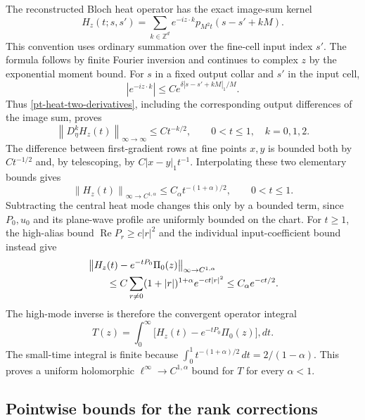 \documentclass[11pt]{article}
\theoremstyle{remark}
\newcommand{\norm}[1]{\left\|#1\right\|}
\begin{document}
The reconstructed Bloch heat operator has the exact image-sum kernel
\begin{equation}\label{pt-twisted-heat}
 H_z(t;s,s')=\sum_{k\in\mathbb Z^d}
             e^{-iz\cdot k}p_{M^2t}(s-s'+kM).
\end{equation}
This convention uses ordinary summation over the fine-cell input
index $s'$. The formula follows by finite Fourier inversion and
continues to complex $z$ by the exponential moment bound.
For $s$ in a fixed output collar and $s'$ in the input cell,
\[
 |e^{-iz\cdot k}|
       \le C e^{\delta|s-s'+kM|_1/M}.
\]
Thus \eqref{pt-heat-two-derivatives}, including the corresponding
output differences of the image sum, proves
\begin{equation}\label{pt-twisted-derivatives}
 \norm{D_\eta^kH_z(t)}_{\infty\to\infty}
       \le Ct^{-k/2},\qquad 0<t\le1,\quad k=0,1,2.
\end{equation}
The difference between first-gradient rows at fine points $x,y$ is
bounded both by $Ct^{-1/2}$ and, by telescoping, by
$C|x-y|_1t^{-1}$. Interpolating these two elementary bounds gives
\begin{equation}\label{pt-heat-holder}
 \norm{H_z(t)}_{\infty\to C^{1,\alpha}}
       \le C_\alpha t^{-(1+\alpha)/2},\qquad 0<t\le1.
\end{equation}
Subtracting the central heat mode changes this only by a bounded
term, since $P_0,u_0$ and its plane-wave profile are uniformly bounded
on the chart. For $t\ge1$, the high-alias bound
$\operatorname{Re}P_r\ge c|r|^2$ and the individual input-coefficient
bound instead give
\begin{align}
 &\norm{H_z(t)-e^{-tP_0}\Pi_0(z)}_{\infty\to C^{1,\alpha}}
       \notag\\
 &\qquad\le C\sum_{r\ne0}(1+|r|)^{1+\alpha}e^{-ct|r|^2}
       \le C_\alpha e^{-ct/2}.
       \label{pt-heat-large-time}
\end{align}
The high-mode inverse is therefore the convergent operator integral
\begin{equation}\label{pt-scalar-integral}
 T(z)=\int_0^\infty
             \bigl[H_z(t)-e^{-tP_0}\Pi_0(z)\bigr],dt.
\end{equation}
The small-time integral is finite because
$\int_0^1t^{-(1+\alpha)/2}\,dt=2/(1-\alpha)$.
This proves a uniform holomorphic
$\ell^\infty\to C^{1,\alpha}$ bound for $T$ for every $\alpha<1$.

\subsection{Pointwise bounds for the rank corrections}
\end{document}
